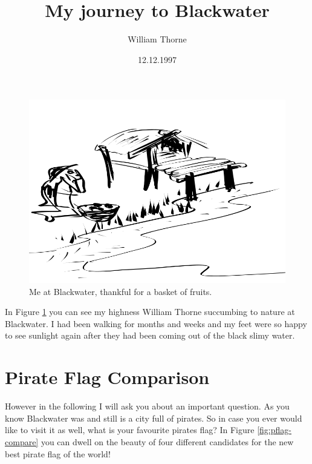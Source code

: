 \documentclass{article}
\title{My journey to Blackwater}
\author {William Thorne}
\date{12.12.1997}
\begin{document}
\maketitle
\newpage
\begin{figure}[!h]
\includegraphics[width=\linewidth]{resources/blackwater.png}
\caption{Me at Blackwater, thankful for a basket of fruits.}
\label{fig:blackwater}
\end{figure}

In Figure \ref{fig:blackwater} you can see my highness William Thorne succumbing to nature at Blackwater. I had been walking for months and weeks and my feet were so happy to see sunlight again after they had been coming out of the black slimy water. 
\section{Pirate Flag Comparison}
However in the following I will ask you about an important question.
As you know Blackwater was and still is a city full of pirates. So in case you ever would like to visit it as well, what is your favourite pirates flag? In Figure \ref{fig:pflag-compare} you can dwell on the beauty of four different candidates for the new best pirate flag of the world!
\end{document}
